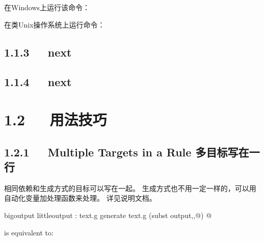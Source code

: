 \documentclass[letterpaper,12pt,english]{sphinxmanual}
\begin{document}
在Windows上运行该命令：

\begin{sphinxVerbatim}[commandchars=\\\{\}]
 
\end{sphinxVerbatim}

在类Unix操作系统上运行命令：

\begin{sphinxVerbatim}[commandchars=\\\{\}]
 
\end{sphinxVerbatim}


\subsection{1.1.3   next}
\label{\detokenize{004.study/001._u7f16_u7a0b/001.make/makefile:next}}

\subsection{1.1.4   next}
\label{\detokenize{004.study/001._u7f16_u7a0b/001.make/makefile:id4}}

\section{1.2   用法技巧}
\label{\detokenize{004.study/001._u7f16_u7a0b/001.make/makefile:id5}}

\subsection{1.2.1   Multiple Targets in a Rule 多目标写在一行}
\label{\detokenize{004.study/001._u7f16_u7a0b/001.make/makefile:multiple-targets-in-a-rule}}
相同依赖和生成方式的目标可以写在一起。 生成方式也不用一定一样的，可以用自动化变量加处理函数来处理。
详见说明文档。

\begin{sphinxVerbatim}[commandchars=\\\{\}]
bigoutput littleoutput : text.g
  generate text.g \PYGZhy{}\PYGZdl{}(subst output,,\PYGZdl{}@) \PYGZgt{} \PYGZdl{}@
\end{sphinxVerbatim}

is equivalent to:

\begin{sphinxVerbatim}[commandchars=\\\{\}]
  
       
  
       
\end{sphinxVerbatim}
\end{document}

